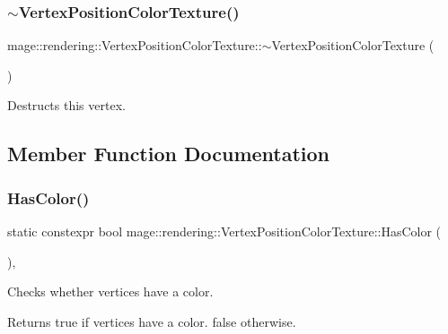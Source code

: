 \subsubsection{\texorpdfstring{$\sim$\+Vertex\+Position\+Color\+Texture()}{~VertexPositionColorTexture()}}
{\footnotesize\ttfamily mage\+::rendering\+::\+Vertex\+Position\+Color\+Texture\+::$\sim$\+Vertex\+Position\+Color\+Texture (\begin{DoxyParamCaption}{ }\end{DoxyParamCaption})\hspace{0.3cm}{\ttfamily [default]}}

Destructs this vertex. 

\subsection{Member Function Documentation}
\hypertarget{structmage_1_1rendering_1_1_vertex_position_color_texture_a1d3db6f6fb5a93ce596e7157fc204f81}{}\label{structmage_1_1rendering_1_1_vertex_position_color_texture_a1d3db6f6fb5a93ce596e7157fc204f81} 
\subsubsection{\texorpdfstring{Has\+Color()}{HasColor()}}
{\footnotesize\ttfamily static constexpr bool mage\+::rendering\+::\+Vertex\+Position\+Color\+Texture\+::\+Has\+Color (\begin{DoxyParamCaption}{ }\end{DoxyParamCaption})\hspace{0.3cm}{\ttfamily [static]}, {\ttfamily [noexcept]}}

Checks whether vertices have a color.

\begin{DoxyReturn}{Returns}
{\ttfamily true} if vertices have a color. {\ttfamily false} otherwise. 
\end{DoxyReturn}
\hypertarget{structmage_1_1rendering_1_1_vertex_position_color_texture_a3823f3163d8350e4c448e99e90cc9436}{}\label{structmage_1_1rendering_1_1_vertex_position_color_texture_a3823f3163d8350e4c448e99e90cc9436} 
